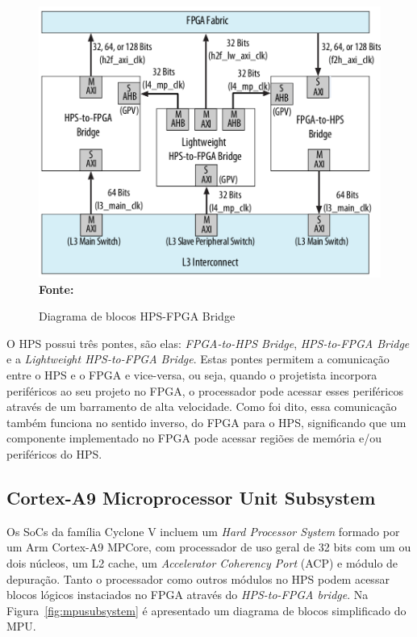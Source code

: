 \begin{figure}[ht]
	\caption{Diagrama de blocos HPS-FPGA Bridge}
	\begin{center}
		\includegraphics[scale=0.35]{imagens/hps-fpga_bridge.png}\\
		{\small \textbf{Fonte:} }
    \end{center}\label{fig:hpsfpgabridge}
\end{figure}

O HPS possui três pontes, são elas: \textit{FPGA-to-HPS Bridge}, \textit{HPS-to-FPGA Bridge} e a \textit{Lightweight HPS-to-FPGA Bridge}. Estas pontes permitem a comunicação entre o HPS e o FPGA e vice-versa, ou seja, quando o projetista incorpora periféricos ao seu projeto no FPGA, o processador pode acessar esses periféricos através de um barramento de alta velocidade. Como foi dito, essa comunicação também funciona no sentido inverso, do FPGA para o HPS, significando que um componente implementado no FPGA pode acessar regiões de memória e/ou periféricos do HPS\@.


\subsection{Cortex-A9 Microprocessor Unit Subsystem}
Os SoCs da família Cyclone V incluem um \textit{Hard Processor System} formado por um Arm Cortex-A9 MPCore, com processador de uso geral de 32 bits com um ou dois núcleos, um L2 cache, um \textit{Accelerator Coherency Port} (ACP) e módulo de depuração. Tanto o processador como outros módulos no HPS podem acessar blocos lógicos instaciados no FPGA através do \textit{HPS-to-FPGA bridge}. Na Figura~\ref{fig:mpusubsystem} é apresentado um diagrama de blocos simplificado do MPU\@.

